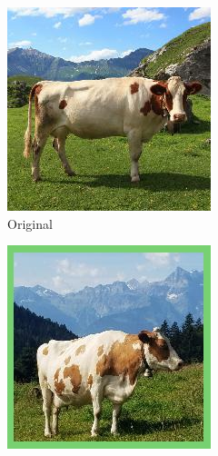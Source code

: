 \begin{figure}[H]
    \centering
    \begin{subfigure}[b]{0.22\textwidth}
        \centering
        \includegraphics[width=\textwidth]{img/introduction/cow_original.jpg}
        \caption{Original}
    \end{subfigure}
    \hfill
    \begin{subfigure}[b]{0.22\textwidth}
        \centering
        \includegraphics[width=\textwidth]{img/introduction/cow_noise.jpg}

\end{subfigure}
\end{figure}
